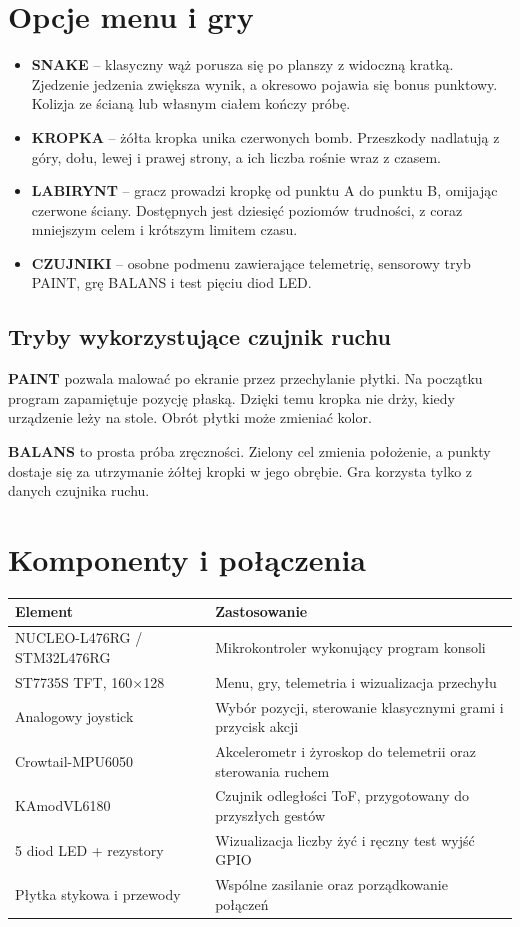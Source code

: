 \documentclass[12pt,a4paper]{article}
\newcommand{\sectiontitle}[1]{%
    \section*{#1}
}
\begin{document}
\newpage
\sectiontitle{Opcje menu i gry}

\begin{itemize}
    \item \textbf{SNAKE} -- klasyczny wąż porusza się po planszy z widoczną
    kratką. Zjedzenie jedzenia zwiększa wynik, a okresowo pojawia się bonus
    punktowy. Kolizja ze ścianą lub własnym ciałem kończy próbę.
    \item \textbf{KROPKA} -- żółta kropka unika czerwonych bomb. Przeszkody
    nadlatują z góry, dołu, lewej i prawej strony, a ich liczba rośnie
    wraz z czasem.
    \item \textbf{LABIRYNT} -- gracz prowadzi kropkę od punktu A do punktu B,
    omijając czerwone ściany. Dostępnych jest dziesięć poziomów trudności,
    z coraz mniejszym celem i krótszym limitem czasu.
    \item \textbf{CZUJNIKI} -- osobne podmenu zawierające telemetrię,
    sensorowy tryb PAINT, grę BALANS i test pięciu diod LED.
\end{itemize}

\subsection*{Tryby wykorzystujące czujnik ruchu}

\textbf{PAINT} pozwala malować po ekranie przez przechylanie płytki.
Na początku program zapamiętuje pozycję płaską. Dzięki temu kropka nie
drży, kiedy urządzenie leży na stole. Obrót płytki może zmieniać kolor.

\textbf{BALANS} to prosta próba zręczności. Zielony cel zmienia położenie,
a punkty dostaje się za utrzymanie żółtej kropki w jego obrębie. Gra korzysta
tylko z danych czujnika ruchu.

\newpage

\sectiontitle{Komponenty i połączenia}

\begin{tabularx}{\textwidth}{@{}lX@{}}
\toprule
\textbf{Element} & \textbf{Zastosowanie} \\
\midrule
NUCLEO-L476RG / STM32L476RG & Mikrokontroler wykonujący program konsoli \\
ST7735S TFT, 160$\times$128 & Menu, gry, telemetria i wizualizacja przechyłu \\
Analogowy joystick & Wybór pozycji, sterowanie klasycznymi grami i przycisk akcji \\
Crowtail-MPU6050 & Akcelerometr i żyroskop do telemetrii oraz sterowania ruchem \\
KAmodVL6180 & Czujnik odległości ToF, przygotowany do przyszłych gestów \\
5 diod LED + rezystory & Wizualizacja liczby żyć i ręczny test wyjść GPIO \\
Płytka stykowa i przewody & Wspólne zasilanie oraz porządkowanie połączeń \\
\bottomrule
\end{tabularx}
\end{document}
